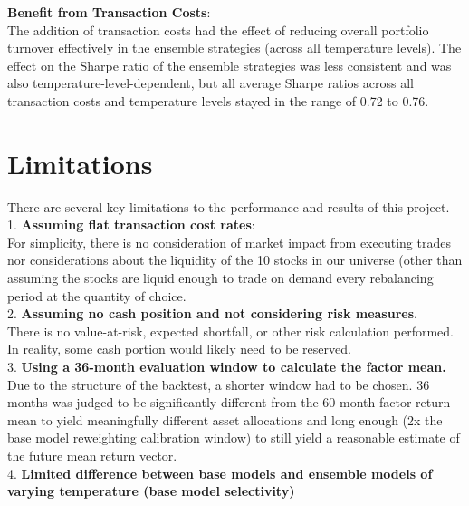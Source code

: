 \documentclass{article}
\begin{document}
\textbf{Benefit from Transaction Costs}:\\

The addition of transaction costs had the effect of reducing overall portfolio turnover effectively in the ensemble strategies (across all temperature levels). The effect on the Sharpe ratio of the ensemble strategies was less consistent and was also temperature-level-dependent, but all average Sharpe ratios across all transaction costs and temperature levels stayed in the range of 0.72 to 0.76.\\

\break

\section{Limitations}

There are several key limitations to the performance and results of this project.\\

1. \textbf{Assuming flat transaction cost rates}:\\

For simplicity, there is no consideration of market impact from executing trades nor considerations about the liquidity of the 10 stocks in our universe (other than assuming the stocks are liquid enough to trade on demand every rebalancing period at the quantity of choice.\\

2. \textbf{Assuming no cash position and not considering risk measures}.\\

There is no value-at-risk, expected shortfall, or other risk calculation performed. In reality, some cash portion would likely need to be reserved.\\

3. \textbf{Using a 36-month evaluation window to calculate the factor mean.}\\

Due to the structure of the backtest, a shorter window had to be chosen. 36 months was judged to be significantly different from the 60 month factor return mean to yield meaningfully different asset allocations and long enough (2x the base model reweighting calibration window) to still yield a reasonable estimate of the future mean return vector.\\

4. \textbf{Limited difference between base models and ensemble models of varying temperature (base model selectivity)}\\
\end{document}
